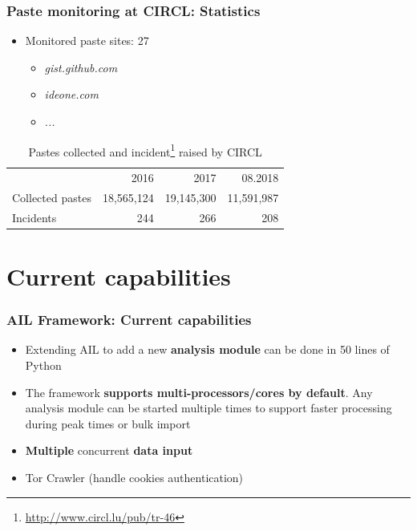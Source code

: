 \documentclass{beamer}
\begin{document}
\begin{frame}
    \frametitle{Paste monitoring at CIRCL: Statistics}
    \begin{itemize}
        \item Monitored paste sites: 27
            \begin{itemize}
                \item \textit{gist.github.com}
                \item \textit{ideone.com}
                \item \textit{...}
            \end{itemize}
    \end{itemize}
    \begin{table}[h]
		\centering
		\begin{tabular}{|lrrr|}
		    \hline
		    \rowcolor{lightgray} & 2016 & 2017 & 08.2018\\
		    Collected pastes & 18,565,124 & 19,145,300 & 11,591,987 \\
		    Incidents & 244 & 266 & 208\\
		    \hline
		\end{tabular}
		\caption{Pastes collected and incident\footnote{\url{http://www.circl.lu/pub/tr-46}} raised by CIRCL}
		\label{circlStats}
	\end{table}
\end{frame}







\section{Current capabilities}

\begin{frame}
    \frametitle{AIL Framework: Current capabilities}
    \begin{itemize}
        \item Extending AIL to add a new {\bf analysis module} can be done in 50 lines of Python
        \item The framework {\bf supports multi-processors/cores by default}. Any analysis module can be started multiple times to support faster processing during peak times or bulk import
        \item \textbf{Multiple} concurrent \textbf{data input}
        \item Tor Crawler (handle cookies authentication)
    \end{itemize}
\end{frame}
\end{document}

